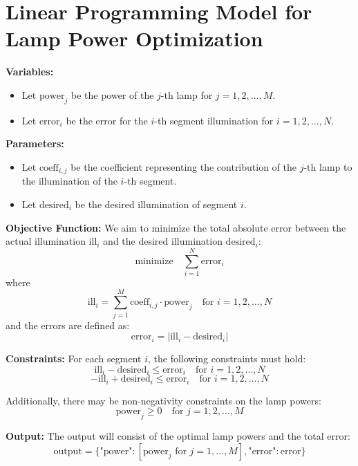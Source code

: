 \documentclass{article}
\begin{document}
\section*{Linear Programming Model for Lamp Power Optimization}

\textbf{Variables:}
\begin{itemize}
    \item Let \( \text{power}_j \) be the power of the \( j \)-th lamp for \( j = 1, 2, \ldots, M \).
    \item Let \( \text{error}_i \) be the error for the \( i \)-th segment illumination for \( i = 1, 2, \ldots, N \).
\end{itemize}

\textbf{Parameters:}
\begin{itemize}
    \item Let \( \text{coeff}_{i,j} \) be the coefficient representing the contribution of the \( j \)-th lamp to the illumination of the \( i \)-th segment.
    \item Let \( \text{desired}_i \) be the desired illumination of segment \( i \).
\end{itemize}

\textbf{Objective Function:}
We aim to minimize the total absolute error between the actual illumination \( \text{ill}_i \) and the desired illumination \( \text{desired}_i \):
\[
\text{minimize} \quad \sum_{i=1}^{N} \text{error}_i
\]
where
\[
\text{ill}_i = \sum_{j=1}^{M} \text{coeff}_{i,j} \cdot \text{power}_j \quad \text{for } i = 1, 2, \ldots, N
\]
and the errors are defined as:
\[
\text{error}_i = |\text{ill}_i - \text{desired}_i|
\]

\textbf{Constraints:}
For each segment \( i \), the following constraints must hold:
\[
\text{ill}_i - \text{desired}_i \leq \text{error}_i \quad \text{for } i = 1, 2, \ldots, N
\]
\[
-\text{ill}_i + \text{desired}_i \leq \text{error}_i \quad \text{for } i = 1, 2, \ldots, N
\]

Additionally, there may be non-negativity constraints on the lamp powers:
\[
\text{power}_j \geq 0 \quad \text{for } j = 1, 2, \ldots, M
\]

\textbf{Output:}
The output will consist of the optimal lamp powers and the total error:
\[
\text{output} = \{ \text{"power"}: [\text{power}_j \text{ for } j = 1, \ldots, M], \text{"error"}: \text{error} \}
\]
\end{document}
